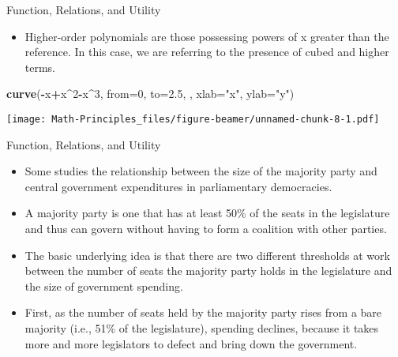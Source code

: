\documentclass[
  ignorenonframetext,
]{beamer}
\newenvironment{Shaded}{\begin{snugshade}}{\end{snugshade}}
\newcommand{\DataTypeTok}[1]{\textcolor[rgb]{0.13,0.29,0.53}{#1}}
\newcommand{\DecValTok}[1]{\textcolor[rgb]{0.00,0.00,0.81}{#1}}
\newcommand{\FloatTok}[1]{\textcolor[rgb]{0.00,0.00,0.81}{#1}}
\newcommand{\KeywordTok}[1]{\textcolor[rgb]{0.13,0.29,0.53}{\textbf{#1}}}
\newcommand{\NormalTok}[1]{#1}
\newcommand{\OperatorTok}[1]{\textcolor[rgb]{0.81,0.36,0.00}{\textbf{#1}}}
\newcommand{\StringTok}[1]{\textcolor[rgb]{0.31,0.60,0.02}{#1}}
\providecommand{\tightlist}{%
  \setlength{\itemsep}{0pt}\setlength{\parskip}{0pt}}
\begin{document}
\begin{frame}[fragile]{Function, Relations, and Utility}
\protect\hypertarget{function-relations-and-utility-19}{}

\begin{itemize}
\tightlist
\item
  Higher-order polynomials are those possessing powers of x greater than
  the reference. In this case, we are referring to the presence of cubed
  and higher terms.
\end{itemize}

\begin{Shaded}
\begin{Highlighting}[]
\KeywordTok{curve}\NormalTok{(}\OperatorTok{-}\NormalTok{x}\OperatorTok{+}\NormalTok{x}\OperatorTok{^}\DecValTok{2}\OperatorTok{-}\NormalTok{x}\OperatorTok{^}\DecValTok{3}\NormalTok{, }\DataTypeTok{from=}\DecValTok{0}\NormalTok{, }\DataTypeTok{to=}\FloatTok{2.5}\NormalTok{, , }\DataTypeTok{xlab=}\StringTok{"x"}\NormalTok{, }\DataTypeTok{ylab=}\StringTok{"y"}\NormalTok{)}
\end{Highlighting}
\end{Shaded}

\texttt{[image: Math-Principles\_files/figure-beamer/unnamed-chunk-8-1.pdf]}

\end{frame}

\begin{frame}{Function, Relations, and Utility}
\protect\hypertarget{function-relations-and-utility-20}{}

\begin{itemize}
\item
  Some studies the relationship between the size of the majority party
  and central government expenditures in parliamentary democracies.
\item
  A majority party is one that has at least 50\% of the seats in the
  legislature and thus can govern without having to form a coalition
  with other parties.
\item
  The basic underlying idea is that there are two different thresholds
  at work between the number of seats the majority party holds in the
  legislature and the size of government spending.
\item
  First, as the number of seats held by the majority party rises from a
  bare majority (i.e., 51\% of the legislature), spending declines,
  because it takes more and more legislators to defect and bring down
  the government.
\end{itemize}

\end{frame}
\end{document}
